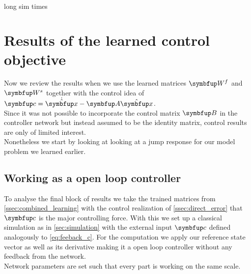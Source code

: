 long sim times

\section{Results of the learned control objective}
Now we review the results when we use the learned matrices $\bmu{W}^f$ and $\bmu{W}^s$ together with the control idea of $\bmu{c} = \dot{\hat{\bmu{x}}} - \bmu{A}\hat{\bmu{x}}$.\\
Since it was not possible to incorporate the control matrix $\bmu{B}$ in the controller network but instead assumed to be the identity matrix, control results are only of limited interest.\\
Nonetheless we start by looking at looking at a jump response for our model problem we learned earlier.
\subsection{Working as a open loop controller}
To analyse the final block of results we take the trained matrices from \cref{ssec:combined_learning} with the control realization of \cref{ssec:direct_error} that $\bmu{c}$ is the major controlling force. With this we set up a classical simulation as in \cref{sec:simulation} with the external input $\bmu{c}$ defined analogously to \cref{eq:feeback_c}. For the computation we apply our reference state vector as well as its derivative making it a open loop controller without any feedback from the network.\\
Network parameters are set such that every part is working on the same scale.\\
